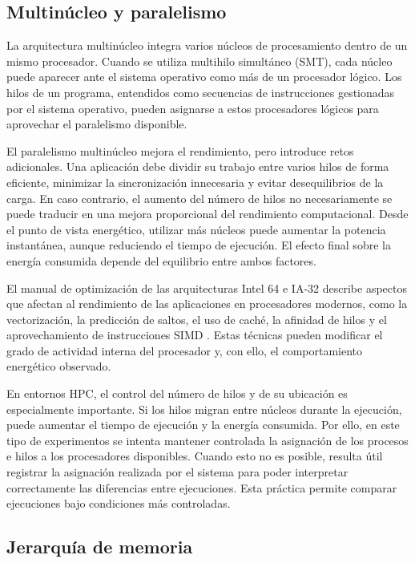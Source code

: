 \subsection{Multinúcleo y paralelismo}

La arquitectura multinúcleo integra varios núcleos de procesamiento dentro de un mismo procesador. Cuando se utiliza multihilo simultáneo (SMT), cada núcleo puede aparecer ante el sistema operativo como más de un procesador lógico. Los hilos de un programa, entendidos como secuencias de instrucciones gestionadas por el sistema operativo, pueden asignarse a estos procesadores lógicos para aprovechar el paralelismo disponible.

El paralelismo multinúcleo mejora el rendimiento, pero introduce retos adicionales. Una aplicación debe dividir su trabajo entre varios hilos de forma eficiente, minimizar la sincronización innecesaria y evitar desequilibrios de la carga. En caso contrario, el aumento del número de hilos no necesariamente se puede traducir en una mejora proporcional del rendimiento computacional. Desde el punto de vista energético, utilizar más núcleos puede aumentar la potencia instantánea, aunque reduciendo el tiempo de ejecución. El efecto final sobre la energía consumida depende del equilibrio entre ambos factores.

El manual de optimización de las arquitecturas Intel 64 e IA-32 describe aspectos que afectan al rendimiento de las aplicaciones en procesadores modernos, como la vectorización, la predicción de saltos, el uso de caché, la afinidad de hilos y el aprovechamiento de instrucciones SIMD \parencite{intelOptimizationManual}. Estas técnicas pueden modificar el grado de actividad interna del procesador y, con ello, el comportamiento energético observado.

En entornos HPC, el control del número de hilos y de su ubicación es especialmente importante. Si los hilos migran entre núcleos durante la ejecución, puede aumentar el tiempo de ejecución y la energía consumida. Por ello, en este tipo de experimentos se intenta mantener controlada la asignación de los procesos e hilos a los procesadores disponibles. Cuando esto no es posible, resulta útil registrar la asignación realizada por el sistema para poder interpretar correctamente las diferencias entre ejecuciones. Esta práctica permite comparar ejecuciones bajo condiciones   más controladas.

\subsection{Jerarquía de memoria}

